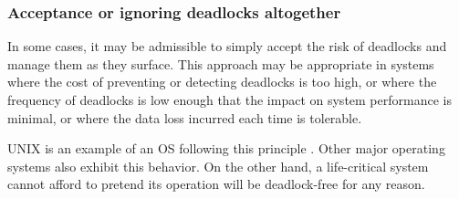 \subsubsection{Acceptance or ignoring deadlocks altogether}

In some cases, it may be admissible
to simply accept the risk of deadlocks and manage them as they surface.
This approach may be appropriate in systems where the cost of preventing
or detecting deadlocks is too high, or where the frequency of deadlocks is low enough
that the impact on system performance is minimal,
or where the data loss incurred each time is tolerable.

UNIX is an example of an \acrshort{OS} following this principle \cite[p. 477]{shibu2016}.
Other major operating systems also exhibit this behavior.
On the other hand, a life-critical system cannot afford
to pretend its operation will be deadlock-free for any reason.